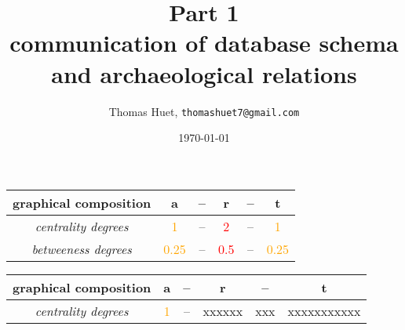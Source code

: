 \documentclass[11pt]{article}
\begin{document}
\title{%
  Part 1\\
  \large  communication of database schema and archaeological relations
  }
\author{Thomas Huet, \texttt{thomashuet7@gmail.com}}
\date{\today}
\maketitle


\begin{center}
 \begin{tabular}{|c c c c c c|}
 \hline
 graphical composition & a & -- & r & -- & t \\
 \hline
 \emph{centrality degrees} & \textcolor{orange}{1} & -- & \textcolor{red}{2} & -- & \textcolor{orange}{1} \\
 \emph{betweeness degrees} & \textcolor{orange}{0.25} & -- & \textcolor{red}{0.5} & -- & \textcolor{orange}{0.25} \\
 \hline
\end{tabular}
\end{center}

\begin{center}
 \begin{tabular}{|c c c c c c|} 
 \hline
 graphical composition & a & -- & r & -- & t \\ 
 \hline
 \textit{centrality degrees} & \textcolor{orange}{1} & -- & xxxxxx & xxx & xxxxxxxxxxx \\
\end{tabular}
\end{center}




\end{document}
